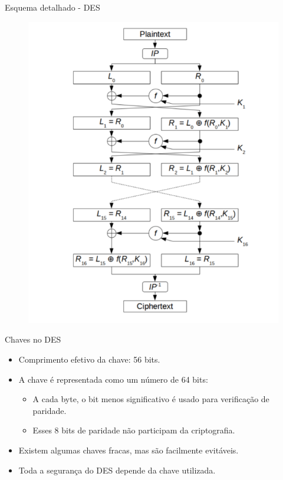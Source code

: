\begin{frame}{Esquema detalhado - DES}
\begin{figure}
    \centering
    \includegraphics[width=0.45\linewidth]{Figuras/DES-esquema-2.png}

\end{figure}
    
\end{frame}

\begin{frame}{Chaves no DES}
    \begin{itemize}
        \item Comprimento efetivo da chave: 56 bits.
        \item A chave é representada como um número de 64 bits:
        \begin{itemize}
            \item A cada byte, o bit menos significativo é usado para verificação de paridade.
            \item Esses 8 bits de paridade não participam da criptografia.
        \end{itemize}
        \item Existem algumas chaves fracas, mas são facilmente evitáveis.
        \item Toda a segurança do DES depende da chave utilizada.
    \end{itemize}
\end{frame}


